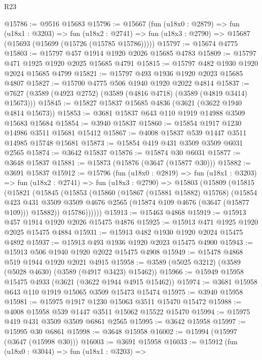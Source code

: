 \begin{lexlean}{R23}
\begin{coremodule}
@15786 := @9516 @15683
@15796 := @15667
    (fun (u18x0 : @2879) =>
    fun (u18x1 : @3203) =>
    fun (u18x2 : @2741) => fun (u18x3 : @2790) => @15687 (@15693 (@15699 (@15726 (@15785 @15786)))))
@15797 := @15674 @4775
@15803 := @15797 @457 @1914 @1920 @2026 @15685 @4783
@15809 := @15797 @471 @1925 @1920 @2025 @15685 @4791
@15815 := @15797 @482 @1930 @1920 @2024 @15685 @4799
@15821 := @15797 @493 @1936 @1920 @2023 @15685 @4807
@15827 := @15700 @4775 @506 @1940 @1920 @2022 @4814
@15837 := @7627 (@3589 (@4923 @2752) (@3589 (@4816 @4718) (@3589 (@4819 @3414) @15673)))
@15845 := @15827 @15837 @15685 @4836 (@3621 (@3622 @1940 @4814 @15673))
@15853 := @3681 @15837 @643 @110 @1919 @14988 @3509 @15683 @15684
@15854 := @3940 @15837
@15860 := @15854 @1917 @1230 @14986 @3511 @15681 @15412
@15867 := @4008 @15837 @539 @1447 @3511 @14985 @15748 @15681
@15873 := @15854 @419 @431 @3509 @3509 @6031 @2565
@15874 := @3642 @15837
@15876 := @15874 @30 @6031
@15877 := @3648 @15837
@15881 := @15873 (@15876 (@3647 (@15877 @30)))
@15882 := @3691 @15837
@15912 := @15796
    (fun (u18x0 : @2819) =>
    fun (u18x1 : @3203) =>
    fun (u18x2 : @2741) =>
    fun (u18x3 : @2790) =>
    @15803
      (@15809
        (@15815
          (@15821
            (@15845
              (@15853
                (@15860
                  (@15867 (@15881 @15882) @15768)
                  (@15854
                    @423
                    @431
                    @3509
                    @3509
                    @4676
                    @2565
                    (@15874 @109 @4676 (@3647 (@15877 @109)))
                    @15882))
                @15786))))))
@15913 := @15463 @4868
@15919 := @15913 @457 @1914 @1920 @2026 @15475 @4876
@15925 := @15913 @471 @1925 @1920 @2025 @15475 @4884
@15931 := @15913 @482 @1930 @1920 @2024 @15475 @4892
@15937 := @15913 @493 @1936 @1920 @2023 @15475 @4900
@15943 := @15913 @506 @1940 @1920 @2022 @15475 @4908
@15949 := @15478 @4868 @519 @1944 @1920 @2021 @4915
@15958 := @3589 (@5025 @3212) (@3589 (@5028 @4630) (@3589 (@4917 @3423) @15462))
@15966 := @15949 @15958 @15475 @4933 (@3621 (@3622 @1944 @4915 @15462))
@15974 := @3681 @15958 @643 @110 @1919 @15065 @3509 @15473 @15474
@15975 := @3940 @15958
@15981 := @15975 @1917 @1230 @15063 @3511 @15470 @15472
@15988 := @4008 @15958 @539 @1447 @3511 @15062 @15522 @15470
@15994 := @15975 @419 @431 @3509 @3509 @6861 @2565
@15995 := @3642 @15958
@15997 := @15995 @30 @6861
@15998 := @3648 @15958
@16002 := @15994 (@15997 (@3647 (@15998 @30)))
@16003 := @3691 @15958
@16033 := @15912
    (fun (u18x0 : @3044) =>
    fun (u18x1 : @3203) =>

\end{coremodule}
\end{lexlean}
